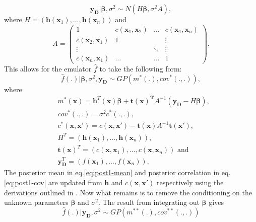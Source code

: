 \documentclass{article}
\newcommand{\simulator}{f}
\newcommand{\emulator}{\hat{f}}
\newcommand{\inputVec}{\mathbf{x}}
\newcommand{\outputVec}{\mathbf{y}}
\newcommand{\basisFuncs}{\mathbf{h}}
\newcommand{\basisCoeffs}{\mathbf{\beta}}
\newcommand{\cov}{cov}
\newcommand{\var}{\sigma^2}
\newcommand{\corr}{c}
\newcommand{\designOutput}{\outputVec_\design}
\newcommand{\design}{\mathbf{D}}
\newcommand{\corrMatrix}{A}
\newcommand{\numDPs}{n}
\newcommand{\GP}{GP}
\begin{document}
\begin{equation}
    \nonumber
    \designOutput | \basisCoeffs, \var \sim N(H \basisCoeffs, \var \corrMatrix),
\end{equation}
where $H = (\basisFuncs(\inputVec_1),\dots,\basisFuncs(\inputVec_\numDPs))$ and 
\begin{equation}
    \label{eq:A}
    \corrMatrix = 
    \begin{pmatrix}
        1 & \corr(\inputVec_1,\inputVec_2) & \dots & \corr(\inputVec_1,\inputVec_\numDPs) \\
        \corr(\inputVec_2,\inputVec_1) & 1 &  & \vdots \\
        \vdots & \ & \ddots & \vdots \\
        \corr(\inputVec_\numDPs,\inputVec_1) & \dots & \dots & 1 
    \end{pmatrix}.
\end{equation}
This allows for the emulator $\emulator$ to take the following form:
\begin{equation}
\nonumber
    \emulator(.)|\basisCoeffs,\var,\designOutput \sim \GP(m^*(.),\cov^*(.,.)),
\end{equation}
where
\begin{align}
    & m^*(\inputVec) = \basisFuncs^T(\inputVec) \basisCoeffs + \mathbf{t(\inputVec)^T} \corrMatrix^{-1} (\mathbf{\designOutput} - H\mathbf{\basisCoeffs}), \label{eq:post1-mean} \\
    & \cov^*(.,.) = \var \corr^*(.,.),\\
    & \corr^*(\inputVec,\inputVec') = \corr(\inputVec,\inputVec') - \mathbf{t(\inputVec)} \corrMatrix^{-1} \mathbf{t(\inputVec')}, \label{eq:post1-cov}\\
    & H^T = (\basisFuncs(\inputVec_1),\dots,\basisFuncs(\inputVec_\numDPs)),\\
    & \mathbf{t(\inputVec)}^T = \left(\corr(\inputVec,\inputVec_1),\dots,\corr(\inputVec,\inputVec_\numDPs) \right) \text{ and}\\
    & \designOutput^T = \left(\simulator(\inputVec_1),\dots,\simulator(\inputVec_\numDPs) \right).
\end{align}
The posterior mean in eq.\eqref{eq:post1-mean} and posterior correlation in eq.\eqref{eq:post1-cov} are updated from $\basisFuncs$ and $\corr(\inputVec,\inputVec')$ respectively using the derivations outlined in \citet{Krzanowski1988}.
Now what remains is to remove the conditioning on the unknown parameters $\mathbf{\basisCoeffs}$ and $\var$. The result from integrating out $\basisCoeffs$ gives
\begin{equation}
    \nonumber
    \emulator(.) | \designOutput,\var \sim \GP(m^{**}(.),\cov^{**}(.,.))
\end{equation}
\end{document}
